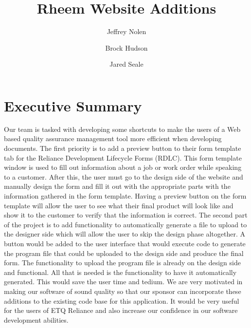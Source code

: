 \documentclass{article}
\title{\bigskip\bigskip\bigskip\bigskip\bigskip\bigskip\bigskip\bigskip\textbf{Rheem Website Additions}\bigskip\bigskip\bigskip\bigskip}
\author{
  Jeffrey Nolen\\
  \and
  Brock Hudson\\
  \and
  Jared Seale\\
}
\date{\parbox{\linewidth}{\centering%
  \today\endgraf\bigskip\bigskip\bigskip\bigskip\bigskip\bigskip\bigskip\bigskip\bigskip\bigskip\bigskip\bigskip\bigskip\bigskip
  Submitted in partial fulfillment of the requirements for
COMP 4710 Senior Design
to the Department of Computer Science and Software Engineering,
Samuel Ginn College of Engineering, Auburn University
\endgraf\endgraf}}
\begin{document}
\maketitle
\newpage
\tableofcontents
\newpage

\section{Executive Summary}
Our team is tasked with developing some shortcuts to make the users of a Web based quality assurance management tool more efficient when developing documents. The first priority is to add a preview button to their form template tab for the Reliance Development Lifecycle Forms (RDLC). This form template window is used to fill out information about a job or work order while speaking to a customer. After this, the user must go to the design side of the website and manually design the form and fill it out with the appropriate parts with the information gathered in the form template.
Having a preview button on the form template will allow the user to see what their final product will look like and show it to the customer to verify that the information is correct. 
The second part of the project is to add functionality to automatically generate a file to upload to the designer side which will allow the user to skip the design phase altogether. A button would be added to the user interface that would execute code to generate the program file that could be uploaded to the design side and produce the final form.
The functionality to upload the program file is already on the design side and functional. All that is needed is the functionality to have it automatically generated. This would save the user time and tedium.
We are very motivated in making our software of sound quality so that our sponsor can incorporate these additions to the existing code base for this application. It would be very useful for the users of ETQ Reliance and also increase our confidence in our software development abilities.
\newpage
\end{document}
